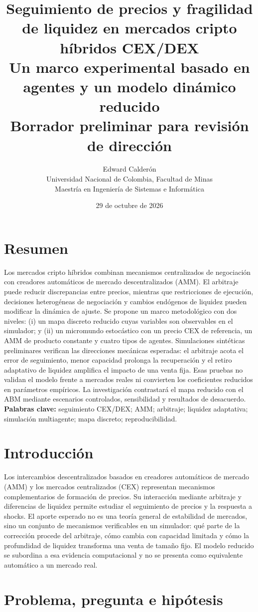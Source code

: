 \documentclass[11pt,a4paper]{article}
\title{\vspace{-1cm}\textbf{Seguimiento de precios y fragilidad de liquidez en mercados cripto híbridos CEX/DEX}\\[4pt]\large Un marco experimental basado en agentes y un modelo dinámico reducido\\[3pt]\normalsize Borrador preliminar para revisión de dirección}
\author{Edward Calderón\\\small Universidad Nacional de Colombia, Facultad de Minas\\\small Maestría en Ingeniería de Sistemas e Informática}
\date{29 de octubre de 2026}
\begin{document}
\maketitle
\section{Resumen}
Los mercados cripto híbridos combinan mecanismos centralizados de negociación con creadores automáticos de mercado descentralizados (AMM). El arbitraje puede reducir discrepancias entre precios, mientras que restricciones de ejecución, decisiones heterogéneas de negociación y cambios endógenos de liquidez pueden modificar la dinámica de ajuste. Se propone un marco metodológico con dos niveles: (i) un mapa discreto reducido cuyas variables son observables en el simulador; y (ii) un micromundo estocástico con un precio CEX de referencia, un AMM de producto constante y cuatro tipos de agentes. Simulaciones sintéticas preliminares verifican las direcciones mecánicas esperadas: el arbitraje acota el error de seguimiento, menor capacidad prolonga la recuperación y el retiro adaptativo de liquidez amplifica el impacto de una venta fija. Esas pruebas no validan el modelo frente a mercados reales ni convierten los coeficientes reducidos en parámetros empíricos. La investigación contrastará el mapa reducido con el ABM mediante escenarios controlados, sensibilidad y resultados de desacuerdo.
\textbf{Palabras clave:} seguimiento CEX/DEX; AMM; arbitraje; liquidez adaptativa; simulación multiagente; mapa discreto; reproducibilidad.
\section{Introducción}
Los intercambios descentralizados basados en creadores automáticos de mercado (AMM) y los mercados centralizados (CEX) representan mecanismos complementarios de formación de precios. Su interacción mediante arbitraje y diferencias de liquidez permite estudiar el seguimiento de precios y la respuesta a shocks. El aporte esperado no es una teoría general de estabilidad de mercados, sino un conjunto de mecanismos verificables en un simulador: qué parte de la corrección procede del arbitraje, cómo cambia con capacidad limitada y cómo la profundidad de liquidez transforma una venta de tamaño fijo. El modelo reducido se subordina a esa evidencia computacional y no se presenta como equivalente automático a un mercado real.

\section{Problema, pregunta e hipótesis}
\end{document}
